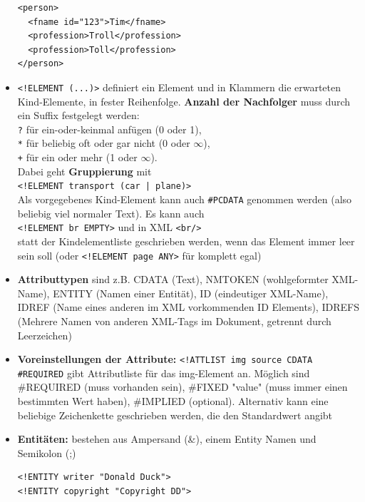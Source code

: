 \documentclass[12pt,landscape]{article}
\def\code#1{\texttt{#1}} %
\begin{document}
\begin{multicols}{3}
\begin{itemize}
\begin{lstlisting}
<person>
  <fname id="123">Tim</fname>
  <profession>Troll</profession>
  <profession>Toll</profession>
</person>
\end{lstlisting}
\item \lstinline|<!ELEMENT (...)>| definiert ein Element und in Klammern die erwarteten Kind-Elemente, in fester Reihenfolge. \textbf{Anzahl der Nachfolger} muss durch ein Suffix festgelegt werden:\\ \lstinline|?| für ein-oder-keinmal anfügen (0 oder 1),\\
\lstinline|*| für beliebig oft oder gar nicht (0 oder $\infty$),\\
\lstinline|+| für ein oder mehr (1 oder $\infty$).\\
Dabei geht \textbf{Gruppierung} mit\\
\lstinline{<!ELEMENT transport (car | plane)>}\\
Als vorgegebenes Kind-Element kann auch \lstinline|#PCDATA| genommen werden (also beliebig viel normaler Text). Es kann auch\\
\lstinline{<!ELEMENT br EMPTY>} und in XML \code{<br/>}\\
statt der Kindelementliste geschrieben werden, wenn das Element immer leer sein soll (oder \lstinline{<!ELEMENT page ANY>} für komplett egal)
\item \textbf{Attributtypen} sind z.B. CDATA (Text), NMTOKEN (wohlgeformter XML-Name), ENTITY (Namen einer Entität), ID (eindeutiger XML-Name), IDREF (Name eines anderen im XML vorkommenden ID Elements), IDREFS (Mehrere Namen von anderen XML-Tags im Dokument, getrennt durch Leerzeichen)
\item \textbf{Voreinstellungen der Attribute:} \lstinline|<!ATTLIST img source CDATA #REQUIRED| gibt Attributliste für das img-Element an. Möglich sind \#REQUIRED (muss vorhanden sein), \#FIXED "value" (muss immer einen bestimmten Wert haben), \#IMPLIED (optional). Alternativ kann eine beliebige Zeichenkette geschrieben werden, die den Standardwert angibt
\item \textbf{Entitäten:} bestehen aus Ampersand (\&), einem Entity Namen und Semikolon (;)
\begin{lstlisting}
<!ENTITY writer "Donald Duck">
<!ENTITY copyright "Copyright DD">


\end{lstlisting}
\end{itemize}
\end{multicols}
\end{document}
